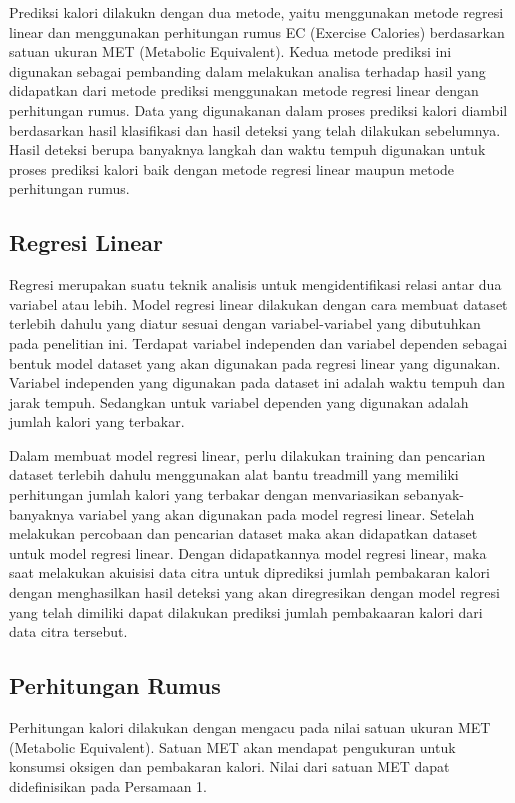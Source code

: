 Prediksi kalori dilakukn dengan dua metode, yaitu menggunakan metode regresi linear dan menggunakan perhitungan rumus EC (Exercise Calories) berdasarkan satuan ukuran MET (Metabolic Equivalent). Kedua metode prediksi ini digunakan sebagai pembanding dalam melakukan analisa terhadap hasil yang didapatkan dari metode prediksi menggunakan metode regresi linear dengan perhitungan rumus. Data yang digunakanan dalam proses prediksi kalori diambil berdasarkan hasil klasifikasi dan hasil deteksi yang telah dilakukan sebelumnya. Hasil deteksi berupa banyaknya langkah dan waktu tempuh digunakan untuk proses prediksi kalori baik dengan metode regresi linear maupun metode perhitungan rumus.

\subsection{Regresi Linear}
\label{subsec:PrediksiRegresi}

Regresi merupakan suatu teknik analisis untuk mengidentifikasi relasi antar dua variabel atau lebih. Model regresi linear dilakukan dengan cara membuat dataset terlebih dahulu yang diatur sesuai dengan variabel-variabel yang dibutuhkan pada penelitian ini. Terdapat variabel independen dan variabel dependen sebagai bentuk model dataset yang akan digunakan pada regresi linear yang digunakan. Variabel independen yang digunakan pada dataset ini adalah waktu tempuh dan jarak tempuh. Sedangkan untuk variabel dependen yang digunakan adalah jumlah kalori yang terbakar.

Dalam membuat model regresi linear, perlu dilakukan training dan pencarian dataset terlebih dahulu menggunakan alat bantu treadmill yang memiliki perhitungan jumlah kalori yang terbakar dengan menvariasikan sebanyak-banyaknya variabel yang akan digunakan pada model regresi linear. Setelah melakukan percobaan dan pencarian dataset maka akan didapatkan dataset untuk model regresi linear. Dengan didapatkannya model regresi linear, maka saat melakukan akuisisi data citra untuk diprediksi jumlah pembakaran kalori dengan menghasilkan hasil deteksi yang akan diregresikan dengan model regresi yang telah dimiliki dapat dilakukan prediksi jumlah pembakaaran kalori dari data citra tersebut.

\subsection{Perhitungan Rumus}
\label{subsec:PrediksiPerhitungan}

Perhitungan kalori dilakukan dengan mengacu pada nilai satuan ukuran MET (Metabolic Equivalent). Satuan MET akan mendapat pengukuran untuk konsumsi oksigen dan pembakaran kalori. Nilai dari satuan MET dapat didefinisikan pada Persamaan 1.

